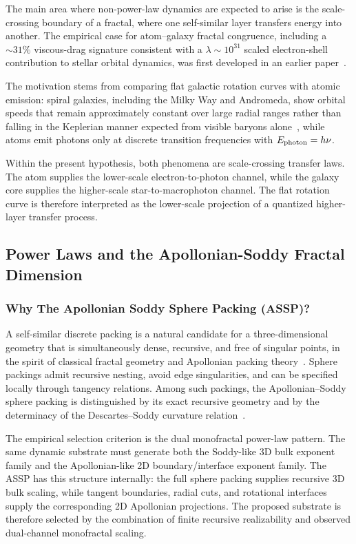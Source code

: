 \documentclass[11pt,a4paper]{article}
\begin{document}
The main area where non-power-law dynamics are expected to arise is the scale-crossing boundary of a fractal, where one self-similar layer transfers energy into another. The empirical case for atom--galaxy fractal congruence, including a \(\sim31\%\) viscous-drag signature consistent with a \(\lambda \sim 10^{31}\) scaled electron-shell contribution to stellar orbital dynamics, was first developed in an earlier paper~\cite{FSEquivalence2026}.

The motivation stems from comparing flat galactic rotation curves with atomic emission: spiral galaxies, including the Milky Way and Andromeda, show orbital speeds that remain approximately constant over large radial ranges rather than falling in the Keplerian manner expected from visible baryons alone~\cite{Sofue2012,Chemin2009}, while atoms emit photons only at discrete transition frequencies with \(E_{\rm photon}=h\nu\).

Within the present hypothesis, both phenomena are scale-crossing transfer laws. The atom supplies the lower-scale electron-to-photon channel, while the galaxy core supplies the higher-scale star-to-macrophoton channel. The flat rotation curve is therefore interpreted as the lower-scale projection of a quantized higher-layer transfer process.

\subsection{Power Laws and the Apollonian-Soddy Fractal Dimension}

\subsubsection{Why The Apollonian Soddy Sphere Packing (ASSP)?}

A self-similar discrete packing is a natural candidate for a three-dimensional geometry that is simultaneously dense, recursive, and free of singular points, in the spirit of classical fractal geometry and Apollonian packing theory~\cite{Mandelbrot1983,Boyd1973,Graham2003,Manna1991}. Sphere packings admit recursive nesting, avoid edge singularities, and can be specified locally through tangency relations. Among such packings, the Apollonian--Soddy sphere packing is distinguished by its exact recursive geometry and by the determinacy of the Descartes--Soddy curvature relation~\cite{Soddy1936,Boyd1973,Graham2003}.

The empirical selection criterion is the dual monofractal power-law pattern. The same dynamic substrate must generate both the Soddy-like 3D bulk exponent family and the Apollonian-like 2D boundary/interface exponent family. The ASSP has this structure internally: the full sphere packing supplies recursive 3D bulk scaling, while tangent boundaries, radial cuts, and rotational interfaces supply the corresponding 2D Apollonian projections. The proposed substrate is therefore selected by the combination of finite recursive realizability and observed dual-channel monofractal scaling.
\end{document}
